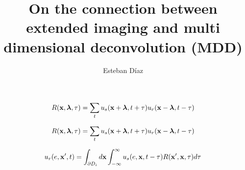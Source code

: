 


\title[]{On the connection between extended imaging and multi dimensional deconvolution (MDD)}
\subtitle{}
\author[]{Esteban D\'{i}az}
\date{}
\logo{}



\Large

\def\big#1{\begin{center} \LARGE \textbf{#1} \end{center}}
\def\cen#1{\begin{center}        \textbf{#1} \end{center}}

 { \cwpcover }



\begin{frame}
  \[
     R({\bf x},{\boldsymbol{\lambda}},\tau) =
     \sum_{t} u_s({\bf x}+{\boldsymbol{\lambda}},t+\tau) u_r({\bf x}-{\boldsymbol{\lambda}},t-\tau)
  \]
\end{frame}


\begin{frame}
  \[
     R({\bf x},{\boldsymbol{\lambda}},\tau) =
     \sum_{t} u_s({\bf x}+{\boldsymbol{\lambda}},t+\tau) u_r({\bf x}-{\boldsymbol{\lambda}},t-\tau)
  \]
\end{frame}


\begin{frame}
  \[
  {u_r}(e,{\bf x}',t) = \int_{\partial D_i} d{\bf x} \int_{-\infty}^{\infty}  {u_s}(e,{\bf x},t-\tau) R({\bf x}',{\bf x},\tau) d\tau
  \]
\end{frame}



\begin{frame}
  \[

  \]
\end{frame}


